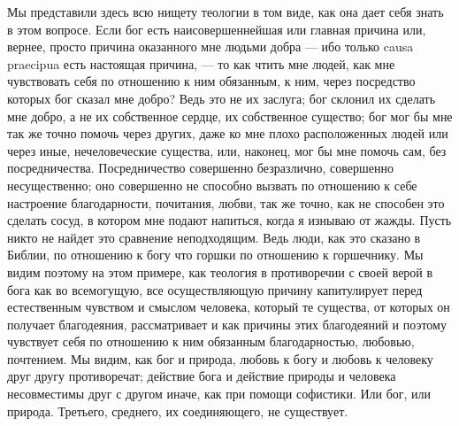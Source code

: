 \documentclass[12pt]{article}
\begin{document}
Мы представили здесь всю нищету теологии в том виде, как она дает себя знать в этом вопросе. Если бог есть наисовершеннейшая или главная причина или, вернее, просто причина оказанного мне людьми добра --- ибо только causa praecipua есть настоящая причина, --- то как чтить мне людей, как мне чувствовать себя по отношению к ним обязанным, к ним, через посредство которых бог сказал мне добро? Ведь это не их заслуга; бог склонил их сделать мне добро, а не их собственное сердце, их собственное существо; бог мог бы мне так же точно помочь через других, даже ко мне плохо расположенных людей или через иные, нечеловеческие существа, или, наконец, мог бы мне помочь сам, без посредничества. Посредничество совершенно безразлично, совершенно несущественно; оно совершенно не способно вызвать по отношению к себе настроение благодарности, почитания, любви, так же точно, как не способен это сделать сосуд, в котором мне подают напиться, когда я изнываю от жажды. Пусть никто не найдет это сравнение неподходящим. Ведь люди, как это сказано в Библии, по отношению к богу что горшки по отношению к горшечнику. Мы видим поэтому на этом примере, как теология в противоречии с своей верой в бога как во всемогущую, все осуществляющую причину капитулирует перед естественным чувством и смыслом человека, который те существа, от которых он получает благодеяния, рассматривает и как причины этих благодеяний и поэтому чувствует себя по отношению к ним обязанным благодарностью, любовью, почтением. Мы видим, как бог и природа, любовь к богу и любовь к человеку друг другу противоречат; действие бога и действие природы и человека несовместимы друг с другом иначе, как при помощи софистики. Или бог, или природа. Третьего, среднего, их соединяющего, не существует. 
\end{document}
